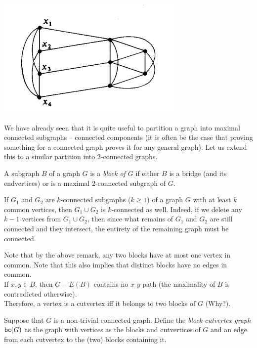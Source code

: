 \begin{center}
    \includegraphics[scale = 0.5]{whitneyCounter.png}
\end{center}

We have already seen that it is quite useful to partition a graph into maximal connected subgraphs -- connected components (it is often be the case that proving something for a connected graph proves it for any general graph). Let us extend this to a similar partition into $2$-connected graphs.

\begin{definition}
A subgraph $B$ of a graph $G$ is a \textit{block of $G$} if either $B$ is a bridge (and its endvertices) or is a maximal $2$-connected subgraph of $G$.
\end{definition}

\begin{remark}
If $G_1$ and $G_2$ are $k$-connected subgraphs ($k\geq 1$) of a graph $G$ with at least $k$ common vertices, then $G_1\cup G_2$ is $k$-connected as well. Indeed, if we delete any $k-1$ vertices from $G_1\cup G_2$, then since what remains of $G_1$ and $G_2$ are still connected and they intersect, the entirety of the remaining graph must be connected. 
\end{remark}

Note that by the above remark, any two blocks have at most one vertex in common. Note that this also implies that distinct blocks have no edges in common.\\
If $x,y\in B$, then $G - E(B)$ contains no $x$-$y$ path (the maximality of $B$ is contradicted otherwise).\\
Therefore, a vertex is a cutvertex iff it belongs to two blocks of $G$ (Why?).

\begin{fdef}
Suppose that $G$ is a non-trivial connected graph. Define the \textit{block-cutvertex graph} $\mathsf{bc}(G)$ as the graph with vertices as the blocks and cutvertices of $G$ and an edge from each cutvertex to the (two) blocks containing it.
\end{fdef}

